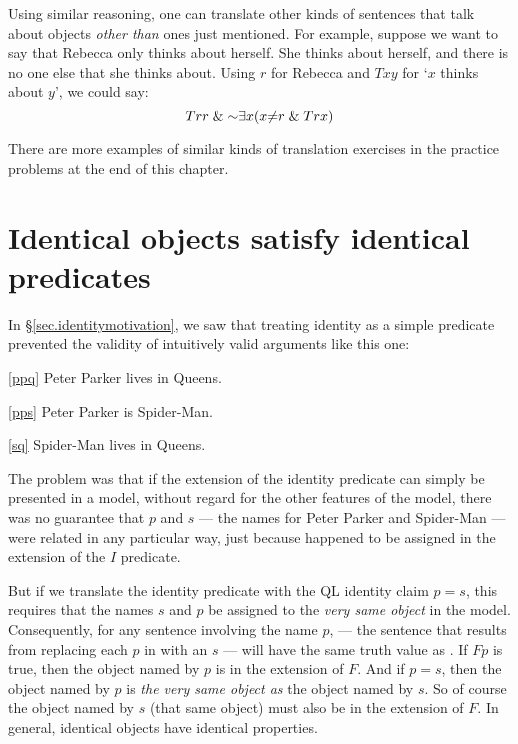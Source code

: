 Using similar reasoning, one can translate other kinds of sentences that talk about objects \emph{other than} ones just mentioned. For example, suppose we want to say that Rebecca only thinks about herself. She thinks about herself, and there is no one else that she thinks about. Using $r$ for Rebecca and $Txy$ for `$x$ thinks about $y$', we could say: $$Trr \eand \enot \qt{\exists}{x} (x {\neq} r \eand Trx)$$

There are more examples of similar kinds of translation exercises in the practice problems at the end of this chapter.

\section{Identical objects satisfy identical predicates}

In \S\ref{sec.identitymotivation}, we saw that treating identity as a simple predicate prevented the validity of intuitively valid arguments like  this one:

\begin{earg}
\item[\ref{ppq}] Peter Parker lives in Queens.
\item[\ref{pps}] Peter Parker is Spider-Man.
\item[\ref{sq}] Spider-Man lives in Queens.
\end{earg}

The problem was that if the extension of the identity predicate can simply be presented in a model, without regard for the other features of the model, there was no guarantee that $p$ and $s$ --- the names for Peter Parker and Spider-Man --- were related in any particular way, just because  happened to be assigned in the extension of the $I$ predicate.

But if we translate the identity predicate with the QL identity claim $p{=}s$, this requires that the names $s$ and $p$ be assigned to the \emph{very same object} in the model. Consequently, for any sentence \metaA{} involving the name $p$, \metaA{} --- the sentence that results from replacing each $p$ in \metaA{} with an $s$ --- will have the same truth value as \metaA{}. If $Fp$ is true, then the object named by $p$ is in the extension of $F$. And if $p{=}s$, then the object named by $p$ is \emph{the very same object as} the object named by $s$. So of course the object named by $s$ (that same object) must also be in the extension of $F$. In general, identical objects have identical properties.

